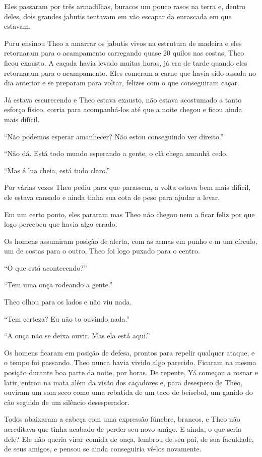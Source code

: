 Eles passaram por três armadilhas, buracos um pouco rasos na terra e,
dentro deles, dois grandes jabutis tentavam em vão escapar da enrascada
em que estavam.

Puru ensinou Theo a amarrar os jabutis vivos na estrutura de madeira e
eles retornaram para o acampamento carregando quase 20 quilos nas
costas, Theo ficou exausto. A caçada havia levado muitas horas, já era
de tarde quando eles retornaram para o acampamento. Eles comeram a carne
que havia sido assada no dia anterior e se preparam para voltar, felizes
com o que conseguiram caçar.

Já estava escurecendo e Theo estava exausto, não estava acostumado a
tanto esforço físico, corria para acompanhá-los até que a noite chegou e
ficou ainda mais difícil.

``Não podemos esperar amanhecer? Não estou conseguindo ver direito.''

``Não dá. Está todo mundo esperando a gente, o clã chega amanhã cedo.

``Mas é lua cheia, está tudo claro.''

Por várias vezes Theo pediu para que parassem, a volta estava bem mais
difícil, ele estava cansado e ainda tinha sua cota de peso para ajudar a
levar.

Em um certo ponto, eles pararam mas Theo não chegou nem a ficar feliz
por que logo percebeu que havia algo errado.

Os homens assumiram posição de alerta, com as armas em punho e m um
círculo, um de costas para o outro, Theo foi logo puxado para o centro.

``O que está acontecendo?''

``Tem uma onça rodeando a gente.''

Theo olhou para os lados e não viu nada.

``Tem certeza? Eu não to ouvindo nada.''

``A onça não se deixa ouvir. Mas ela está aqui.''

Os homens ficaram em posição de defesa, prontos para repelir qualquer
ataque, e o tempo foi passando. Theo nunca havia vivido algo parecido.
Ficaram na mesma posição durante boa parte da noite, por horas. De
repente, Yá começou a rosnar e latir, entrou na mata além da visão dos
caçadores e, para desespero de Theo, ouviram um som seco como uma
rebatida de um taco de beisebol, um ganido do cão seguido de um silêncio
desesperador.

Todos abaixaram a cabeça com uma expressão fúnebre, brancos, e Theo não
acreditava que tinha acabado de perder seu novo amigo. E ainda, o que
seria dele? Ele não queria virar comida de onça, lembrou de seu pai, de
sua faculdade, de seus amigos, e pensou se ainda conseguiria vê-los
novamente.

